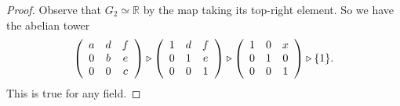 \documentclass{article}
\begin{document}
\begin{xmpl}
\begin{enumerate}
{\begin{proof}
        Observe that $G_2 \simeq \mathbb{R}$ by the map taking its
        top-right element. So we have the abelian tower
        $$
        \left(\begin{array}{c c c}
          a & d & f \\ 0 & b & e \\ 0 & 0 & c
        \end{array}\right)
        \triangleright
        \left(\begin{array}{c c c}
          1 & d & f \\ 0 & 1 & e \\ 0 & 0 & 1
        \end{array}\right)
        \triangleright
        \left(\begin{array}{c c c}
          1 & 0 & x \\ 0 & 1 & 0 \\ 0 & 0 & 1
        \end{array}\right)
        \triangleright \{ 1 \}.
        $$
        This is true for any field.
      \end{proof}
    }
\end{enumerate}
\end{xmpl}

\end{document}

